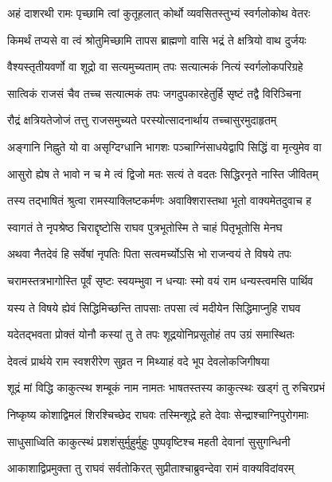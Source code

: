 \twolineshloka
{अहं दाशरथी रामः पृच्छामि त्वां कुतूहलात्}
{कोर्थो व्यवसितस्तुभ्यं स्वर्गलोकोथ वेतरः}%

\twolineshloka
{किमर्थं तप्यसे वा त्वं श्रोतुमिच्छामि तापस}
{ब्राह्मणो वासि भद्रं ते क्षत्रियो वाथ दुर्जयः}%

\twolineshloka
{वैश्यस्तृतीयवर्णो वा शूद्रो वा सत्यमुच्यताम्}
{तपः सत्यात्मकं नित्यं स्वर्गलोकपरिग्रहे}%

\twolineshloka
{सात्विकं राजसं चैव तच्च सत्यात्मकं तपः}
{जगदुपकारहेतुर्हि सृष्टं तद्वै विरिञ्चिना}%

\twolineshloka
{रौद्रं क्षत्रियतेजोजं तत्तु राजसमुच्यते}
{परस्योत्सादनार्थाय तच्चासुरमुदाहृतम्}%

\twolineshloka
{अङ्गानि निह्नुते यो वा असृग्दिग्धानि भागशः}
{पञ्चाग्निंसाधयेद्वापि सिद्धिं वा मृत्युमेव वा}%

\twolineshloka
{आसुरो ह्येष ते भावो न च मे त्वं द्विजो मतः}
{सत्यं ते वदतः सिद्धिरनृते नास्ति जीवितम्}%

\twolineshloka
{तस्य तद्भाषितं श्रुत्वा रामस्याक्लिष्टकर्मणः}
{अवाक्शिरास्तथा भूतो वाक्यमेतदुवाच ह}%

\twolineshloka
{स्वागतं ते नृपश्रेष्ठ चिराद्दृष्टोसि राघव}
{पुत्रभूतोस्मि ते चाहं पितृभूतोसि मेनघ}%

\twolineshloka
{अथवा नैतदेवं हि सर्वेषां नृपतिः पिता}
{सत्वमर्च्योऽसि भो राजन्वयं ते विषये तपः}%

\twolineshloka
{चरामस्तत्रभागोस्ति पूर्वं सृष्टः स्वयम्भुवा}
{न धन्याः स्मो वयं राम धन्यस्त्वमसि पार्थिव}%

\twolineshloka
{यस्य ते विषये ह्येवं सिद्धिमिच्छन्ति तापसाः}
{तपसा त्वं मदीयेन सिद्धिमाप्नुहि राघव}%

\twolineshloka
{यदेतद्भवता प्रोक्तं योनौ कस्यां तु ते तपः}
{शूद्रयोनिप्रसूतोहं तप उग्रं समास्थितः}%

\twolineshloka
{देवत्वं प्रार्थये राम स्वशरीरेण सुव्रत}
{न मिथ्याहं वदे भूप देवलोकजिगीषया}%

\twolineshloka
{शूद्रं मां विद्धि काकुत्स्थ शम्बूकं नाम नामतः}
{भाषतस्तस्य काकुत्स्थः खड्गं तु रुचिरप्रभं}%

\twolineshloka
{निष्कृष्य कोशाद्विमलं शिरश्चिच्छेद राघवः}
{तस्मिन्शूद्रे हते देवाः सेन्द्राश्चाग्निपुरोगमाः}%

\twolineshloka
{साधुसाध्विति काकुत्स्थं प्रशशंसुर्मुहुर्मुहुः}
{पुष्पवृष्टिश्च महती देवानां सुसुगन्धिनी}%

\twolineshloka
{आकाशाद्विप्रमुक्ता तु राघवं सर्वतोकिरत्}
{सुप्रीताश्चाब्रुवन्देवा रामं वाक्यविदांवरम्}%

